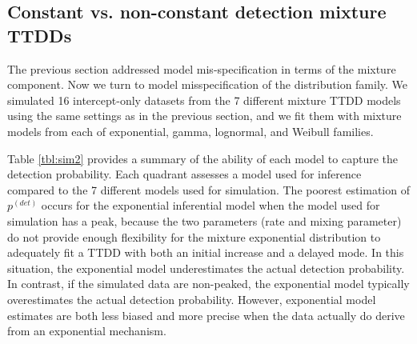 \documentclass[12pt]{article}
\newcommand{\pdet}{p^{(det)}}
\begin{document}








\subsection{Constant vs. non-constant detection mixture TTDDs}\label{sec:family}

The previous section addressed model mis-specification in terms of the mixture component. 
Now we turn to model misspecification of the distribution family. 
We simulated 16 intercept-only datasets from the 7 different mixture TTDD models using the same settings as in the previous section, and we fit them with mixture models from each of exponential, gamma, lognormal, and Weibull families.

Table \ref{tbl:sim2} provides a summary of the ability of each model to capture the detection probability. 
Each quadrant assesses a model used for inference compared to the 7 different models used for simulation. 
The poorest estimation of $\pdet$ occurs for the exponential inferential model when the model used for simulation has a peak, because the two parameters (rate and mixing parameter) do not provide enough flexibility for the mixture exponential distribution to adequately fit a TTDD with both an initial increase and a delayed mode. 
In this situation, the exponential model underestimates the actual detection probability.
In contrast, if the simulated data are non-peaked, the exponential model typically overestimates the actual detection probability. 
However, exponential model estimates are both less biased and more precise when the data actually do derive from an exponential mechanism.
\end{document}

